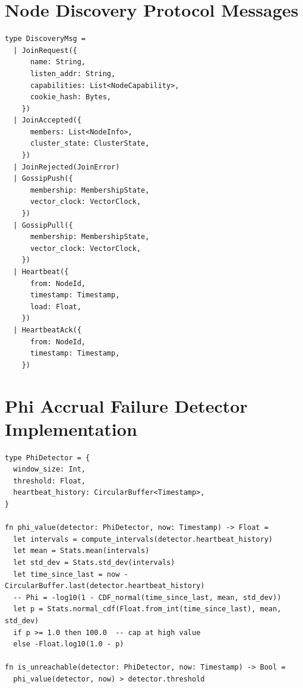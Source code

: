 \documentclass[11pt,a4paper]{article}
\begin{document}
\section{Node Discovery Protocol Messages}
\label{app:discovery}

\begin{lstlisting}
type DiscoveryMsg =
  | JoinRequest({
      name: String,
      listen_addr: String,
      capabilities: List<NodeCapability>,
      cookie_hash: Bytes,
    })
  | JoinAccepted({
      members: List<NodeInfo>,
      cluster_state: ClusterState,
    })
  | JoinRejected(JoinError)
  | GossipPush({
      membership: MembershipState,
      vector_clock: VectorClock,
    })
  | GossipPull({
      membership: MembershipState,
      vector_clock: VectorClock,
    })
  | Heartbeat({
      from: NodeId,
      timestamp: Timestamp,
      load: Float,
    })
  | HeartbeatAck({
      from: NodeId,
      timestamp: Timestamp,
    })
\end{lstlisting}

\section{Phi Accrual Failure Detector Implementation}
\label{app:phi}

\begin{lstlisting}
type PhiDetector = {
  window_size: Int,
  threshold: Float,
  heartbeat_history: CircularBuffer<Timestamp>,
}

fn phi_value(detector: PhiDetector, now: Timestamp) -> Float =
  let intervals = compute_intervals(detector.heartbeat_history)
  let mean = Stats.mean(intervals)
  let std_dev = Stats.std_dev(intervals)
  let time_since_last = now - CircularBuffer.last(detector.heartbeat_history)
  -- Phi = -log10(1 - CDF_normal(time_since_last, mean, std_dev))
  let p = Stats.normal_cdf(Float.from_int(time_since_last), mean, std_dev)
  if p >= 1.0 then 100.0  -- cap at high value
  else -Float.log10(1.0 - p)

fn is_unreachable(detector: PhiDetector, now: Timestamp) -> Bool =
  phi_value(detector, now) > detector.threshold
\end{lstlisting}
\end{document}
